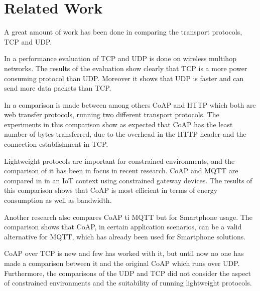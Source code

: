 \section{Related Work}\label{sec:relatedwork}
A great amount of work has been done in comparing the transport protocols, TCP and UDP. 

In \cite{giannoulis2009tcp} a performance evaluation of TCP and UDP is done on wireless multihop networks. The results of the evaluation show clearly that TCP is a more power consuming protocol than UDP. Moreover it shows that UDP is faster and can send more data packets than TCP.

In \cite{bandyopadhyay2013lightweight} a comparison is made between among others CoAP and HTTP which both are web transfer protocols, running two different transport protocols. The experiments in this comparison show as expected that CoAP has the least number of bytes transferred, due to the overhead in the HTTP header and the connection establishment in TCP.


Lightweight protocols are important for constrained environments, and the comparison of it has been in focus in recent research.
CoAP and MQTT are compared in \cite{bandyopadhyay2013lightweight} in an IoT context using constrained gateway devices. The results of this comparison shows that CoAP is most efficient in terms of energy consumption as well as bandwidth.

Another research \cite{de2013comparison} also compares CoAP ti MQTT but for Smartphone usage. The comparison shows that CoAP, in certain application scenarios, can be a valid alternative for MQTT, which has already been used for Smartphone solutions.

CoAP over TCP is new and few has worked with it, but until now no one has made a comparison between it and the original CoAP which runs over UDP. 
Furthermore, the comparisons of the UDP and TCP did not consider the aspect of constrained environments and the suitability of running lightweight protocols.